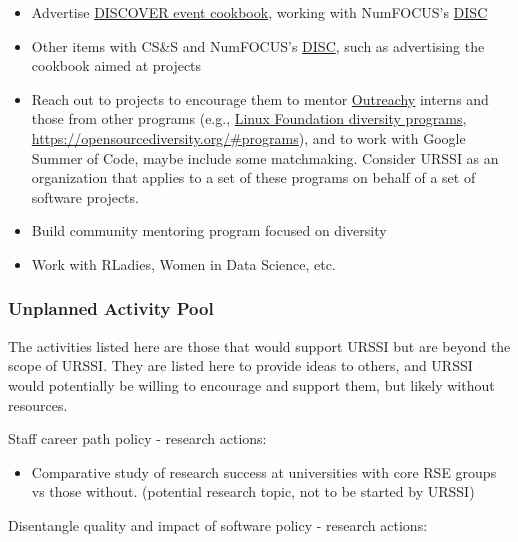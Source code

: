 \documentclass[
]{book}
\providecommand{\tightlist}{%
  \setlength{\itemsep}{0pt}\setlength{\parskip}{0pt}}
\begin{document}
\begin{itemize}
\item
  Advertise \href{https://discover-cookbook.numfocus.org}{DISCOVER event cookbook}, working with
  NumFOCUS's \href{https://numfocus.org/programs/diversity-inclusion}{DISC}
\item
  Other items with CS\&S and NumFOCUS's \href{https://numfocus.org/programs/diversity-inclusion}{DISC},
  such as advertising the cookbook aimed at projects
\item
  Reach out to projects to encourage them to mentor \href{https://www.outreachy.org}{Outreachy} interns
  and those from other programs (e.g.,
  \href{https://www.linuxfoundation.org/about/diversity-inclusiveness/programs/}{Linux Foundation diversity programs},
  \url{https://opensourcediversity.org/\#programs}), and to work with Google Summer of Code, maybe
  include some matchmaking. Consider URSSI as an organization that applies to a set of these
  programs on behalf of a set of software projects.
\item
  Build community mentoring program focused on diversity
\item
  Work with RLadies, Women in Data Science, etc.
\end{itemize}

\hypertarget{unplanned-activity-pool}{%
\subsubsection{Unplanned Activity Pool}\label{unplanned-activity-pool}}

The activities listed here are those that would support URSSI but are beyond the scope of URSSI.
They are listed here to provide ideas to others, and URSSI would potentially be willing to encourage
and support them, but likely without resources.

Staff career path policy - research actions:

\begin{itemize}
\tightlist
\item
  Comparative study of research success at universities with core RSE groups vs those without.
  (potential research topic, not to be started by URSSI)
\end{itemize}

Disentangle quality and impact of software policy - research actions:
\end{document}
